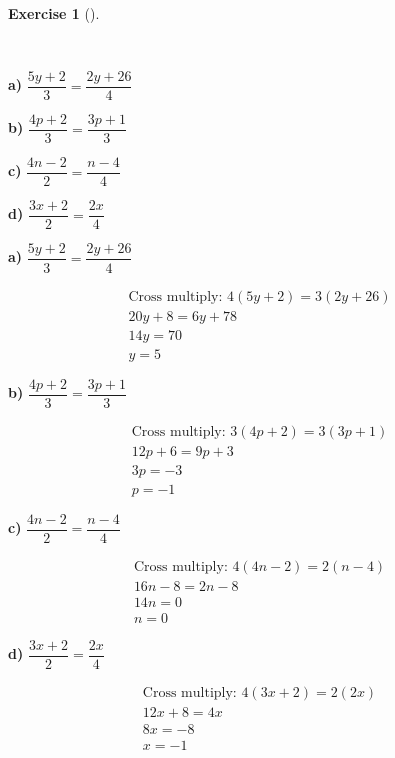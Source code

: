 \documentclass[
  letterpaper,
  DIV=11,
  numbers=noendperiod]{scrreprt}
\theoremstyle{definition}
\newtheorem{exercise}{Exercise}[chapter]
\theoremstyle{remark}
\begin{document}
\begin{exercise}[]\protect\hypertarget{exr-u5-14}{}\label{exr-u5-14}

~

\textbf{a)} \(\displaystyle \dfrac{5y + 2}{3} = \dfrac{2y + 26}{4}\)

\textbf{b)} \(\displaystyle \dfrac{4p + 2}{3} = \dfrac{3p + 1}{3}\)

\textbf{c)} \(\displaystyle \dfrac{4n - 2}{2} = \dfrac{n - 4}{4}\)

\textbf{d)} \(\displaystyle \dfrac{3x + 2}{2} = \dfrac{2x}{4}\)

\begin{tcolorbox}[enhanced jigsaw, opacitybacktitle=0.6, coltitle=black, arc=.35mm, colframe=quarto-callout-tip-color-frame, colback=white, bottomrule=.15mm, left=2mm, colbacktitle=quarto-callout-tip-color!10!white, titlerule=0mm, opacityback=0, title=\textcolor{quarto-callout-tip-color}{\faLightbulb}\hspace{0.5em}{🔍 View Solutions}, leftrule=.75mm, breakable, rightrule=.15mm, bottomtitle=1mm, toptitle=1mm, toprule=.15mm]

\textbf{a)} \(\displaystyle \dfrac{5y + 2}{3} = \dfrac{2y + 26}{4}\)

\begin{align*}
\text{Cross multiply: } 4(5y + 2) = 3(2y + 26) \\ 20y + 8 = 6y + 78 \\ 14y = 70 \\ y = 5
\end{align*}

\textbf{b)} \(\displaystyle \dfrac{4p + 2}{3} = \dfrac{3p + 1}{3}\)

\begin{align*}
\text{Cross multiply: } 3(4p + 2) = 3(3p + 1) \\ 12p + 6 = 9p + 3 \\ 3p = -3 \\ p = -1
\end{align*}

\textbf{c)} \(\displaystyle \dfrac{4n - 2}{2} = \dfrac{n - 4}{4}\)

\begin{align*}
\text{Cross multiply: } 4(4n - 2) = 2(n - 4) \\ 16n - 8 = 2n - 8 \\ 14n = 0 \\ n = 0
\end{align*}

\textbf{d)} \(\displaystyle \dfrac{3x + 2}{2} = \dfrac{2x}{4}\)

\begin{align*}
\text{Cross multiply: } 4(3x + 2) = 2(2x) \\ 12x + 8 = 4x \\ 8x = -8 \\ x = -1
\end{align*}

\end{tcolorbox}

\end{exercise}
\end{document}
